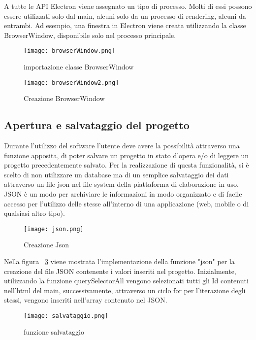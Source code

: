 A tutte le API Electron viene assegnato un tipo di processo. Molti di essi possono essere utilizzati solo dal main, alcuni solo da un processo di rendering, alcuni da entrambi. Ad esempio, una finestra in Electron viene creata utilizzando la classe BrowserWindow, disponibile solo nel processo principale.

\begin{figure}[H]
    \centering
    \texttt{[image: browserWindow.png]}
    \caption{importazione classe BrowserWindow}
    \label{fig:BrowserWindow}
\end{figure}

\begin{figure}[H]
    \centering
    \texttt{[image: browserWindow2.png]}
    \caption{Creazione BrowserWindow}
    \label{fig:BrowserWindow2}
\end{figure}



\subsection {Apertura e salvataggio del progetto}

Durante l'utilizzo del software l'utente deve avere la possibilità attraverso una funzione apposita, di poter salvare un progetto in stato d'opera e/o di leggere un progetto precedentemente salvato.
Per la realizzazione di questa funzionalità, si è scelto di non utilizzare un database ma di un semplice salvataggio dei dati attraverso un file \Gls{json} nel file system della piattaforma di elaborazione in uso.
JSON è un modo per archiviare le informazioni in modo organizzato e di facile accesso per l'utilizzo delle stesse all'interno di una applicazione (web, mobile o di qualsiasi altro tipo).

\begin{figure}[H]
    \centering
    \texttt{[image: json.png]}
    \caption{Creazione Json}
    \label{fig:json}
\end{figure}

Nella figura ~\ref{fig:json} viene mostrata l'implementazione della funzione "json" per la creazione del file JSON contenente i valori inseriti nel progetto. Inizialmente, utilizzando la funzione querySelectorAll vengono selezionati tutti gli Id contenuti nell'html del main, successivamente, attraverso un ciclo for per l'iterazione degli stessi, vengono inseriti nell'array contenuto nel JSON.

\begin{figure}[H]
    \centering
    \texttt{[image: salvataggio.png]}
    \caption{funzione salvataggio}
    \label{fig:salvataggio}
\end{figure}

